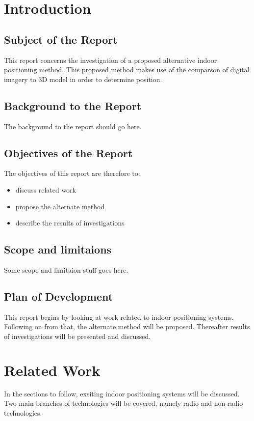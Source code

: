 \documentclass[11pt,a4paper]{article}
\begin{document}
\newpage
\tableofcontents

\setcounter{page}{0}

\newpage
\section{Introduction}
	\subsection{Subject of the Report}
		This report concerns the investigation of a proposed alternative indoor positioning method. This proposed method makes use of the comparson of digital imagery to 3D model in order to determine position.
	
	\subsection{Background to the Report}
		The background to the report should go here.
	
	\subsection{Objectives of the Report}
		The objectives of this report are therefore to:
		\begin{itemize}
			\item discuss related work
			\item propose the alternate method
			\item describe the results of investigations
		\end{itemize}
	
	\subsection{Scope and limitaions}
		Some scope and limitaion stuff goes here.
	
	\subsection{Plan of Development}
		This report begins by looking at work related to indoor positioning systems. Following on from that, the alternate method will be proposed. Thereafter results of investigations will be presented and discussed.

\newpage
\section{Related Work}
	In the sections to follow, exsiting indoor positioning systems will be discussed. Two main branches of technologies will be covered, namely radio and non-radio technologies.
	
\end{document}
